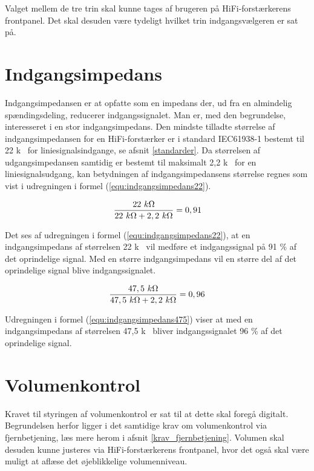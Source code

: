 Valget mellem de tre trin skal kunne tages af brugeren på HiFi-forstærkerens frontpanel. Det skal desuden være tydeligt hvilket trin indgangsvælgeren er sat på.

\section{Indgangsimpedans}
\label{krav_indgangsimpedans}
Indgangsimpedansen er at opfatte som en impedans der, ud fra en almindelig spændingsdeling, reducerer indgangssignalet. Man er, med den begrundelse, interesseret i en stor indgangsimpedans. Den mindste tilladte størrelse af indgangsimpedansen for en HiFi-forstærker er i standard IEC61938-1 bestemt til 22 k\ohm~ for liniesignalsindgange, se afsnit \ref{standarder}. Da størrelsen af udgangsimpedansen samtidig er bestemt til maksimalt 2,2 k\ohm~ for en liniesignalsudgang, kan betydningen af indgangsimpedansens størrelse regnes som vist i udregningen i formel (\ref{equ:indgangsimpedans22}). 

\begin{equation}
\label{equ:indgangsimpedans22}
\frac{22~k\ohm}{22~k\ohm + 2,2~k\ohm} = 0,91
\end{equation}

Det ses af udregningen i formel (\ref{equ:indgangsimpedans22}), at en indgangsimpedans af størrelsen 22 k\ohm~ vil medføre et indgangssignal på 91 \% af det oprindelige signal. Med en større indgangsimpedans vil en større del af det oprindelige signal blive indgangssignalet. 

\begin{equation}
\label{equ:indgangsimpedans475}
\frac{47,5~k\ohm}{47,5~k\ohm + 2,2~k\ohm} = 0,96
\end{equation}

Udregningen i formel (\ref{equ:indgangsimpedans475}) viser at med en indgangsimpedans af størrelsen 47,5 k\ohm~ bliver indgangssignalet 96 \% af det oprindelige signal.

\section{Volumenkontrol}
\label{krav_volumenkontrol}
Kravet til styringen af volumenkontrol er sat til at dette skal foregå digitalt. Begrundelsen herfor ligger i det samtidige krav om volumenkontrol via fjernbetjening, læs mere herom i afsnit \ref{krav_fjernbetjening}. Volumen skal desuden kunne justeres via HiFi-forstærkerens frontpanel, hvor det også skal være muligt at aflæse det øjeblikkelige volumenniveau.  

